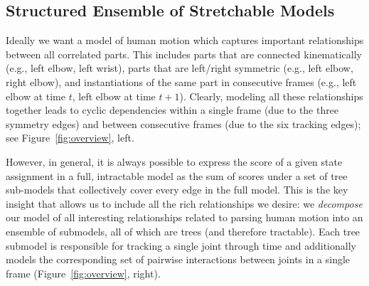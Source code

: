 \subsection{Structured Ensemble of Stretchable Models}
Ideally we want a model of human motion which captures important
relationships between all correlated parts.  This includes parts that
are connected kinematically (e.g., left elbow, left wrist), parts that
are left/right symmetric (e.g., left elbow, right elbow), and
instantiations of the same part in consecutive frames (e.g., left
elbow at time $t$, left elbow at time $t+1$).  Clearly, modeling all
these relationships together leads to cyclic dependencies
within a single frame (due to the three symmetry edges) and
between consecutive frames (due to the six tracking edges); see Figure~\ref{fig:overview}, left. 

However, in general, it is always possible to express the score of a
given state assignment in a full, intractable model as the sum of
scores under a set of tree sub-models that collectively cover every
edge in the full model. This is the key insight that allows us to
include all the rich relationships we desire: we {\em decompose} our
model of all interesting relationships related to parsing human motion
into an ensemble of submodels, all of which are trees (and therefore
tractable). Each tree submodel is responsible for tracking a single
joint through time and additionally models the corresponding set of
pairwise interactions between joints in a single frame
(Figure~\ref{fig:overview}, right).

